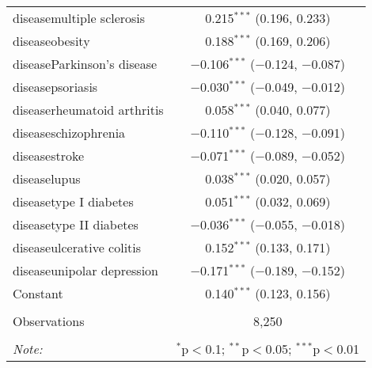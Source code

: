 \begin{table}[!htbp]
\begin{tabular}{@{\extracolsep{5pt}}lc}
  diseasemultiple sclerosis & 0.215$^{***}$ (0.196, 0.233) \\ 
  diseaseobesity & 0.188$^{***}$ (0.169, 0.206) \\ 
  diseaseParkinson's disease & $-$0.106$^{***}$ ($-$0.124, $-$0.087) \\ 
  diseasepsoriasis & $-$0.030$^{***}$ ($-$0.049, $-$0.012) \\ 
  diseaserheumatoid arthritis & 0.058$^{***}$ (0.040, 0.077) \\ 
  diseaseschizophrenia & $-$0.110$^{***}$ ($-$0.128, $-$0.091) \\ 
  diseasestroke & $-$0.071$^{***}$ ($-$0.089, $-$0.052) \\ 
  diseaselupus & 0.038$^{***}$ (0.020, 0.057) \\ 
  diseasetype I diabetes & 0.051$^{***}$ (0.032, 0.069) \\ 
  diseasetype II diabetes & $-$0.036$^{***}$ ($-$0.055, $-$0.018) \\ 
  diseaseulcerative colitis & 0.152$^{***}$ (0.133, 0.171) \\ 
  diseaseunipolar depression & $-$0.171$^{***}$ ($-$0.189, $-$0.152) \\ 
  Constant & 0.140$^{***}$ (0.123, 0.156) \\ 
 \hline \\[-1.8ex] 
Observations & 8,250 \\ 
\hline 
\hline \\[-1.8ex] 
\textit{Note:}  & \multicolumn{1}{r}{$^{*}$p$<$0.1; $^{**}$p$<$0.05; $^{***}$p$<$0.01} \\ 
\end{tabular} 
\end{table} 
